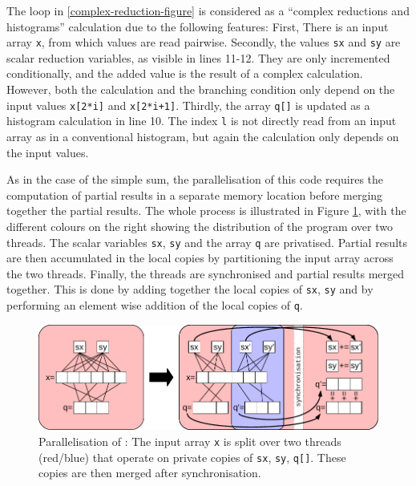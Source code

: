     The loop in \ref{complex-reduction-figure} is considered as a
    ``complex reductions and histograms'' calculation due to the following
    features:
    First, There is an input array \texttt{x}, from which values are read
    pairwise.
    Secondly, the values \texttt{sx} and \texttt{sy} are scalar reduction
    variables, as visible in lines 11-12.
    They are only incremented conditionally, and the added value is the result
    of a complex calculation.
    However, both the calculation and the branching condition only depend on the
    input values \texttt{x[2*i]} and \texttt{x[2*i+1]}.
    Thirdly, the array \texttt{q[]} is updated as a histogram calculation in
    line 10.
    The index \texttt{l} is not directly read from an input array as in a
    conventional histogram, but again the calculation only depends on the input
    values.

    As in the case of the simple sum, the parallelisation of this code
    requires the computation of partial results in a separate memory
    location before merging together the partial results.
    The whole process is illustrated in Figure \ref{nice-picture}, with the
    different colours on the right showing the distribution of the program
    over two threads.
    The scalar variables \texttt{sx}, \texttt{sy} and the array \texttt{q} are
    privatised.
    Partial results are then accumulated in the local copies by partitioning the
    input array across the two threads. 
    Finally, the threads are synchronised and partial results merged together.
    This is done by adding together the local copies of \texttt{sx}, \texttt{sy}
    and by performing an element wise addition of the local copies of
    \texttt{q}. 

\begin{figure}[t]
\centering
\includegraphics[width=\textwidth]{figures/parallelisereduction.pdf}
\caption{Parallelisation of :
         The input array \texttt{x} is split over two threads (red/blue)
         that operate on private copies of \texttt{sx}, \texttt{sy}, \texttt{q[]}.
         These copies are then merged after synchronisation.\parfillskip=0pt}
\label{nice-picture}
\end{figure}



